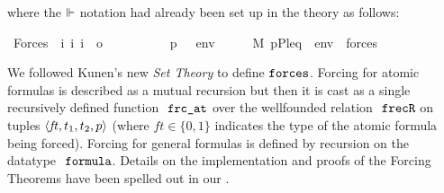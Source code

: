 where the $\Vdash$ notation had already been set up in the theory
 as follows:
\begin{isabelle}
\isamarkupfalse%
\ Forces\ {\isacharcolon}{\kern0pt}{\isacharcolon}{\kern0pt}\ {\isachardoublequoteopen}{\isacharbrackleft}{\kern0pt}i{\isacharcomma}{\kern0pt}\ i{\isacharcomma}{\kern0pt}\ i{\isacharbrackright}{\kern0pt}\ {\isasymRightarrow}\ o{\isachardoublequoteclose}\ \ {\isacharparenleft}{\kern0pt}{\isachardoublequoteopen}{\isacharunderscore}{\kern0pt}\ {\isasymtturnstile}\ {\isacharunderscore}{\kern0pt}\ {\isacharunderscore}{\kern0pt}{\isachardoublequoteclose}\ {\isacharbrackleft}{\kern0pt}{}{}{\isacharcomma}{\kern0pt}{}{}{\isacharcomma}{\kern0pt}{}{}{\isacharbrackright}{\kern0pt}\ {}{}{\isacharparenright}{\kern0pt}\ \isanewline
\ \ {\isachardoublequoteopen}p\ {\isasymtturnstile}\ {\isasymphi}\ env\ \ \ {\isasymequiv}\ \ \ M{\isacharcomma}{\kern0pt}\ {\isacharparenleft}{\kern0pt}{\isacharbrackleft}{\kern0pt}p{\isacharcomma}{\kern0pt}P{\isacharcomma}{\kern0pt}leq{\isacharcomma}{\kern0pt}{\isasymone}{\isacharbrackright}{\kern0pt}\ {\isacharat}{\kern0pt}\ env{\isacharparenright}{\kern0pt}\ {\isasymTurnstile}\ forces{\isacharparenleft}{\kern0pt}{\isasymphi}{\isacharparenright}{\kern0pt}{\isachardoublequoteclose}\isanewline
\end{isabelle}

We followed Kunen's new \textit{Set Theory} \cite{kunen2011set} to define
$\mathop{\mathtt{forces}}$.  Forcing for atomic formulas is described as a mutual
recursion
but then \cite[p.~257]{kunen2011set} it is cast as a single
recursively defined function $\frcat$ over the wellfounded relation
$\isatt{frecR}$ on tuples $\langle \mathit{ft},t_1,t_2,p\rangle$ (where
$\mathit{ft}\in\{0,1\}$ indicates the type of the atomic formula being
forced). Forcing for general formulas is defined by recursion on the
datatype $\formula$. Details on the implementation and proofs of the
Forcing Theorems have been spelled out in our
\cite{2020arXiv200109715G}.

